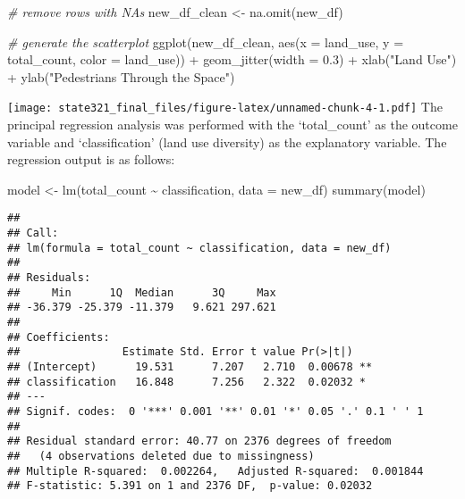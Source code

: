 \documentclass[
]{article}
\newenvironment{Shaded}{\begin{snugshade}}{\end{snugshade}}
\newcommand{\AttributeTok}[1]{\textcolor[rgb]{0.77,0.63,0.00}{#1}}
\newcommand{\CommentTok}[1]{\textcolor[rgb]{0.56,0.35,0.01}{\textit{#1}}}
\newcommand{\FloatTok}[1]{\textcolor[rgb]{0.00,0.00,0.81}{#1}}
\newcommand{\FunctionTok}[1]{\textcolor[rgb]{0.00,0.00,0.00}{#1}}
\newcommand{\NormalTok}[1]{#1}
\newcommand{\OtherTok}[1]{\textcolor[rgb]{0.56,0.35,0.01}{#1}}
\newcommand{\SpecialCharTok}[1]{\textcolor[rgb]{0.00,0.00,0.00}{#1}}
\newcommand{\StringTok}[1]{\textcolor[rgb]{0.31,0.60,0.02}{#1}}
\begin{document}
\begin{Shaded}
\begin{Highlighting}[]
\CommentTok{\# remove rows with NAs}
\NormalTok{new\_df\_clean }\OtherTok{\textless{}{-}} \FunctionTok{na.omit}\NormalTok{(new\_df)}

\CommentTok{\# generate the scatterplot}
\FunctionTok{ggplot}\NormalTok{(new\_df\_clean, }\FunctionTok{aes}\NormalTok{(}\AttributeTok{x =}\NormalTok{ land\_use, }\AttributeTok{y =}\NormalTok{ total\_count, }\AttributeTok{color =}\NormalTok{ land\_use)) }\SpecialCharTok{+}
  \FunctionTok{geom\_jitter}\NormalTok{(}\AttributeTok{width =} \FloatTok{0.3}\NormalTok{) }\SpecialCharTok{+}
  \FunctionTok{xlab}\NormalTok{(}\StringTok{"Land Use"}\NormalTok{) }\SpecialCharTok{+}
  \FunctionTok{ylab}\NormalTok{(}\StringTok{"Pedestrians Through the Space"}\NormalTok{)}
\end{Highlighting}
\end{Shaded}

\texttt{[image: state321\_final\_files/figure-latex/unnamed-chunk-4-1.pdf]}
The principal regression analysis was performed with the `total\_count'
as the outcome variable and `classification' (land use diversity) as the
explanatory variable. The regression output is as follows:

\begin{Shaded}
\begin{Highlighting}[]
\NormalTok{model }\OtherTok{\textless{}{-}} \FunctionTok{lm}\NormalTok{(total\_count }\SpecialCharTok{\textasciitilde{}}\NormalTok{ classification, }\AttributeTok{data =}\NormalTok{ new\_df)}
\FunctionTok{summary}\NormalTok{(model)}
\end{Highlighting}
\end{Shaded}

\begin{verbatim}
## 
## Call:
## lm(formula = total_count ~ classification, data = new_df)
## 
## Residuals:
##     Min      1Q  Median      3Q     Max 
## -36.379 -25.379 -11.379   9.621 297.621 
## 
## Coefficients:
##                Estimate Std. Error t value Pr(>|t|)   
## (Intercept)      19.531      7.207   2.710  0.00678 **
## classification   16.848      7.256   2.322  0.02032 * 
## ---
## Signif. codes:  0 '***' 0.001 '**' 0.01 '*' 0.05 '.' 0.1 ' ' 1
## 
## Residual standard error: 40.77 on 2376 degrees of freedom
##   (4 observations deleted due to missingness)
## Multiple R-squared:  0.002264,   Adjusted R-squared:  0.001844 
## F-statistic: 5.391 on 1 and 2376 DF,  p-value: 0.02032
\end{verbatim}
\end{document}
